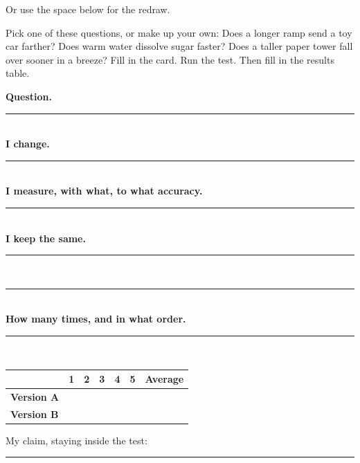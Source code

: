 Or use the space below for the redraw.

\begin{center}
\end{center}

\clearpage
\thispagestyle{fancy}
Pick one of these questions, or make up your own: Does a longer ramp send a toy car farther? Does warm water dissolve sugar faster? Does a taller paper tower fall over sooner in a breeze? Fill in the card. Run the test. Then fill in the results table.
\begin{tcolorbox}[enhanced,colback=white,colframe=sky,boxrule=1.2pt,arc=2mm,left=8pt,right=8pt,top=6pt,bottom=6pt,before skip=7pt,after skip=7pt]
\sffamily\small
\textbf{Question.}\\[10pt]\rule{\linewidth}{0.5pt}\\[8pt]
\textbf{I change.}\\[10pt]\rule{\linewidth}{0.5pt}\\[8pt]
\textbf{I measure, with what, to what accuracy.}\\[10pt]\rule{\linewidth}{0.5pt}\\[8pt]
\textbf{I keep the same.}\\[10pt]\rule{\linewidth}{0.5pt}\\[10pt]\rule{\linewidth}{0.5pt}\\[8pt]
\textbf{How many times, and in what order.}\\[10pt]\rule{\linewidth}{0.5pt}\\[4pt]
\end{tcolorbox}
\renewcommand{\arraystretch}{2.2}
\begin{center}\sffamily\scriptsize
\begin{tabular}{|l|c|c|c|c|c|c|}
\hline
 & \textbf{1} & \textbf{2} & \textbf{3} & \textbf{4} & \textbf{5} & \textbf{Average}\\ \hline
\textbf{Version A} & & & & & & \\ \hline
\textbf{Version B} & & & & & & \\ \hline
\end{tabular}
\end{center}
My claim, staying inside the test: \wline[5.5cm]\\[8pt]
\rule{\linewidth}{0.5pt}

